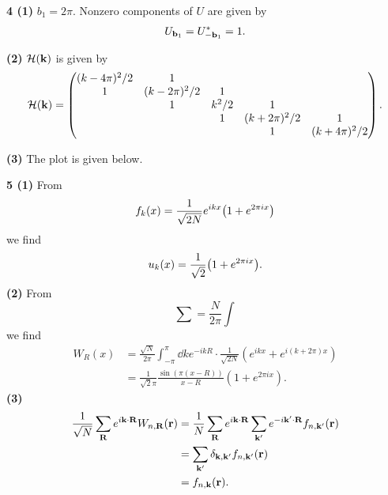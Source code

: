 \documentclass{article}
\makeatletter
\newcommand*{\shifttext}[1]{%
  \settowidth{\@tempdima}{#1}%
  \hspace{-\@tempdima}#1%
}
\newcommand{\plabel}[1]{%
\shifttext{\textbf{#1}\quad}%
}
\newcommand{\prule}{%
\begin{center}%
\hdashrule[0.5ex]{.99\linewidth}{1pt}{1pt 2.5pt}%
\end{center}%
}
\newcommand{\minusbaseline}{\abovedisplayskip=0pt\abovedisplayshortskip=0pt~\vspace*{-\baselineskip}}%
\makeatother
\begin{document}
\prule

\plabel{4 (1)}%
$b_1 = 2\pi$.
Nonzero components of $U$ are given by
\begin{align*}
    U_{\vb{b}_1} = U^*_{-\vb{b}_1} = 1.
\end{align*}

\plabel{(2)}%
$\mathcal{H}(\vb{k})$ is given by
\begin{align*}
    \mathcal{H}(\vb{k}) = \begin{pmatrix}
        (k-4\pi)^2/2 &1 & & & \\
        1& (k-2\pi)^2/2 &1 & & \\
        & 1& k^2/2 &1 & \\
        & & 1& (k+2\pi)^2/2 &1 \\
        & & & 1& (k+4\pi)^2/2
    \end{pmatrix}.
\end{align*}

\plabel{(3)}%
The plot is given below.
\begin{center}
\end{center}

\prule

\plabel{5 (1)}%
From
\[ f_k(x) = \frac{1}{\sqrt{2N}}e^{ikx}\qty(1 + e^{2\pi ix}) \]
we find
\[ u_k(x) = \frac{1}{\sqrt{2}} \qty(1 + e^{2\pi ix}). \]
\plabel{(2)}%
From
\[ \sum = \frac{N}{2\pi}\int \]
we find
\begin{align*}
    W_R(x) &= \frac{\sqrt{N}}{2\pi} \int_{-\pi}^\pi \dd{k} e^{-ikR}\cdot \frac{1}{\sqrt{2N}}(e^{ikx} + e^{i(k+2\pi)x}) \\
    &= \frac{1}{\sqrt{2}\pi} \frac{\sin(\pi(x-R))}{x-R} (1+e^{2\pi i x}).
\end{align*}
\plabel{(3)}%
\begingroup\minusbaseline
\begin{align*}
    \frac{1}{\sqrt{N}} \sum_{\vb{R}} e^{i\vb{k}\cdot\vb{R}} W_{n,\vb{R}}(\vb{r}) &= \frac{1}{N} \sum_{\vb{R}} e^{i\vb{k}\cdot\vb{R}} \sum_{\vb{k}'} e^{-i\vb{k}'\cdot\vb{R}} f_{n,\vb{k}'}(\vb{r}) \\
    &= \sum_{\vb{k}'} \delta_{\vb{k},\vb{k}'} f_{n,\vb{k}'}(\vb{r}) \\
    &= f_{n,\vb{k}}(\vb{r}).
\end{align*}
\endgroup

% 
% 
\end{document}
